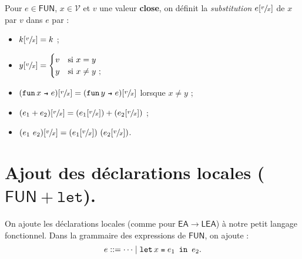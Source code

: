 \documentclass[../main]{subfiles}
\begin{document}
  \begin{defn}
    Pour $e \in \mathsf{FUN}$, $x \in \mathcal{V}$ et $v$ une valeur \textbf{close}, on définit la \textit{substitution} $e[\sfrac{v}{x}]$ de $x$ par $v$ dans $e$ par :
    \begin{itemize}
      \item $k[\sfrac{v}{x}] = k$ ;
      \item $y[\sfrac{v}{x}] = \begin{cases}
          v & \text{si}\ x = y\\
          y & \text{si}\ x \neq y\ ;
      \end{cases}$
    \item $(\fun x e)[\sfrac{v}{x}] = (\fun y e)[\sfrac{v}{x}]$ lorsque $x \neq y$ ;
      \item $(e_1 + e_2)[\sfrac{v}{x}] = (e_1[\sfrac{v}{x}]) + (e_2[\sfrac{v}{x}])$ ;
      \item $(e_1 \ e_2)[\sfrac{v}{x}] = (e_1[\sfrac{v}{x}]) \ (e_2[\sfrac{v}{x}])$.
    \end{itemize}
  \end{defn}

  \section{Ajout des déclarations locales ($\mathsf{FUN}+\mathtt{let}$).}

  On ajoute les déclarations locales (comme pour $\mathsf{EA}\to \mathsf{LEA}$) à notre petit langage fonctionnel.
  Dans la grammaire des expressions de $\mathsf{FUN}$, on ajoute :
  \[
    e ::= \cdots  \mid \letin x {e_1} {e_2}
  .\]
\end{document}

